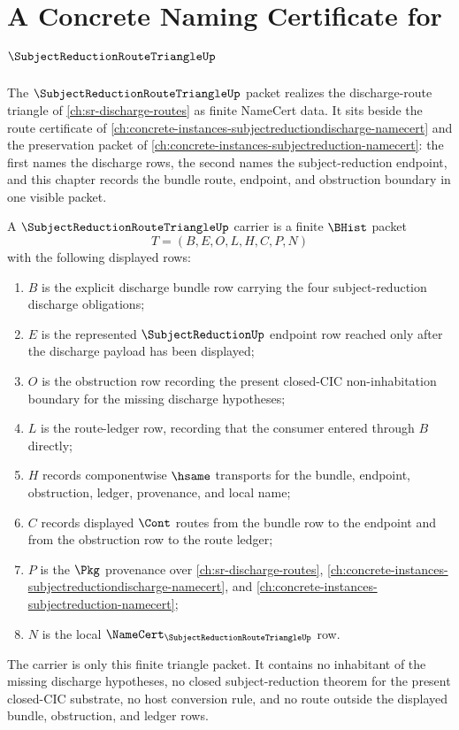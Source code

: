 \chapter{A Concrete Naming Certificate for $\SubjectReductionRouteTriangleUp$}
\label{ch:concrete-instances-subjectreductionroutetriangle-namecert}

The $\SubjectReductionRouteTriangleUp$ packet realizes the discharge-route
triangle of \autoref{ch:sr-discharge-routes} as finite NameCert data. It sits
beside the route certificate of
\autoref{ch:concrete-instances-subjectreductiondischarge-namecert} and the
preservation packet of \autoref{ch:concrete-instances-subjectreduction-namecert}:
the first names the discharge rows, the second names the subject-reduction
endpoint, and this chapter records the bundle route, endpoint, and obstruction
boundary in one visible packet.

\begin{definition}
\label{def:subject-reduction-route-triangle-carrier}
A $\SubjectReductionRouteTriangleUp$ carrier is a finite $\BHist$ packet
$$
T=(B,E,O,L,H,C,P,N)
$$
with the following displayed rows:
\begin{enumerate}
\item $B$ is the explicit discharge bundle row carrying the four subject-reduction discharge obligations;
\item $E$ is the represented $\SubjectReductionUp$ endpoint row reached only after the discharge payload has been displayed;
\item $O$ is the obstruction row recording the present closed-CIC non-inhabitation boundary for the missing discharge hypotheses;
\item $L$ is the route-ledger row, recording that the consumer entered through $B$ directly;
\item $H$ records componentwise $\hsame$ transports for the bundle, endpoint, obstruction, ledger, provenance, and local name;
\item $C$ records displayed $\Cont$ routes from the bundle row to the endpoint and from the obstruction row to the route ledger;
\item $P$ is the $\Pkg$ provenance over \autoref{ch:sr-discharge-routes}, \autoref{ch:concrete-instances-subjectreductiondischarge-namecert}, and \autoref{ch:concrete-instances-subjectreduction-namecert};
\item $N$ is the local $\NameCert_{\SubjectReductionRouteTriangleUp}$ row.
\end{enumerate}
The carrier is only this finite triangle packet. It contains no inhabitant of
the missing discharge hypotheses, no closed subject-reduction theorem for the
present closed-CIC substrate, no host conversion rule, and no route outside the
displayed bundle, obstruction, and ledger rows.
\end{definition}

